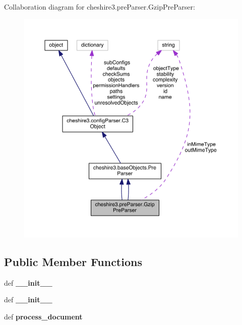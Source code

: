 Collaboration diagram for cheshire3.\-pre\-Parser.\-Gzip\-Pre\-Parser\-:
\nopagebreak
\begin{figure}[H]
\begin{center}
\leavevmode
\includegraphics[width=350pt]{classcheshire3_1_1pre_parser_1_1_gzip_pre_parser__coll__graph}
\end{center}
\end{figure}
\subsection*{Public Member Functions}
\begin{DoxyCompactItemize}
\item 
\hypertarget{classcheshire3_1_1pre_parser_1_1_gzip_pre_parser_a1abb9866f09588d05a4479a234178eb5}{def {\bfseries \-\_\-\-\_\-init\-\_\-\-\_\-}}\label{classcheshire3_1_1pre_parser_1_1_gzip_pre_parser_a1abb9866f09588d05a4479a234178eb5}

\item 
\hypertarget{classcheshire3_1_1pre_parser_1_1_gzip_pre_parser_a1abb9866f09588d05a4479a234178eb5}{def {\bfseries \-\_\-\-\_\-init\-\_\-\-\_\-}}\label{classcheshire3_1_1pre_parser_1_1_gzip_pre_parser_a1abb9866f09588d05a4479a234178eb5}

\item 
\hypertarget{classcheshire3_1_1pre_parser_1_1_gzip_pre_parser_a99eee5bd853e802234b2a6d8c4cd52ff}{def {\bfseries process\-\_\-document}}\label{classcheshire3_1_1pre_parser_1_1_gzip_pre_parser_a99eee5bd853e802234b2a6d8c4cd52ff}

\end{DoxyCompactItemize}
